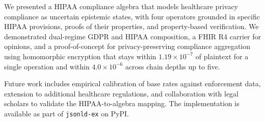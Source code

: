 \documentclass[conference]{IEEEtran}
\begin{document}
We presented a HIPAA compliance algebra that models healthcare privacy compliance as uncertain epistemic states, with four operators grounded in specific HIPAA provisions, proofs of their properties, and property-based verification. We demonstrated dual-regime GDPR and HIPAA composition, a FHIR R4 carrier for opinions, and a proof-of-concept for privacy-preserving compliance aggregation using homomorphic encryption that stays within $1.19 \times 10^{-7}$ of plaintext for a single operation and within $4.0 \times 10^{-6}$ across chain depths up to five.

Future work includes empirical calibration of base rates against enforcement data, extension to additional healthcare regulations, and collaboration with legal scholars to validate the HIPAA-to-algebra mapping. The implementation is available as part of \texttt{jsonld-ex} on PyPI.

\balance


\end{document}
